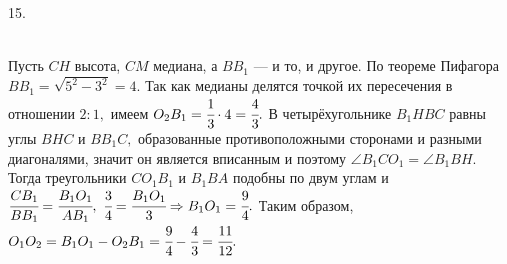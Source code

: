 15. \begin{figure}[ht!]
\end{figure}\\
Пусть $CH$ высота, $CM$ медиана, а $BB_1$ --- и то, и другое. По теореме Пифагора $BB_1=\sqrt{5^2-3^2}=4.$ Так как медианы делятся точкой их пересечения в отношении $2:1,$ имеем $O_2B_1=\cfrac{1}{3}\cdot4=\cfrac{4}{3}.$ В четырёхугольнике $B_1HBC$ равны углы $BHC$ и $BB_1C,$ образованные противоположными сторонами и разными диагоналями, значит он является вписанным и поэтому $\angle B_1CO_1=\angle B_1BH.$ Тогда треугольники $CO_1B_1$ и $B_1BA$ подобны по двум углам и  $\cfrac{CB_1}{BB_1}=\cfrac{B_1O_1}{AB_1},\ \cfrac{3}{4}=\cfrac{B_1O_1}{3}\Rightarrow B_1O_1=\cfrac{9}{4}.$ Таким образом, $O_1O_2=B_1O_1-O_2B_1=\cfrac{9}{4}-\cfrac{4}{3}=\cfrac{11}{12}.$\\
